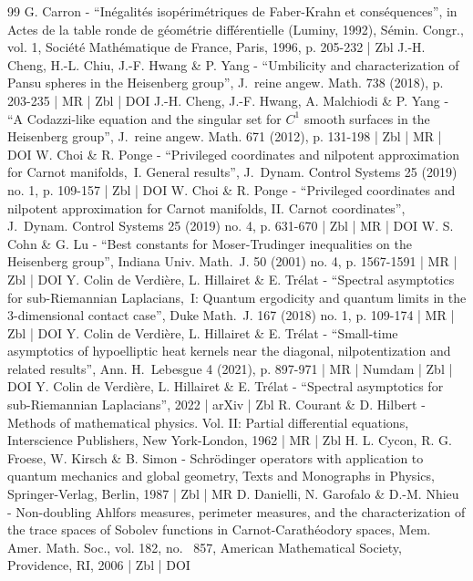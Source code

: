 \begin{thebibliography}{99}
G. Carron - “Inégalités isopérimétriques de Faber-Krahn et conséquences”, in Actes de la table ronde de géométrie différentielle (Luminy, 1992), Sémin. Congr., vol. 1, Société Mathématique de France, Paris, 1996, p. 205-232 | Zbl
J.-H. Cheng, H.-L. Chiu, J.-F. Hwang \& P. Yang - “Umbilicity and characterization of Pansu spheres in the Heisenberg group”, J. reine angew. Math. 738 (2018), p. 203-235 | MR | Zbl | DOI
J.-H. Cheng, J.-F. Hwang, A. Malchiodi \& P. Yang - “A Codazzi-like equation and the singular set for $C^1$ smooth surfaces in the Heisenberg group”, J. reine angew. Math. 671 (2012), p. 131-198 | Zbl | MR | DOI
W. Choi \& R. Ponge - “Privileged coordinates and nilpotent approximation for Carnot manifolds, I. General results”, J. Dynam. Control Systems 25 (2019) no. 1, p. 109-157 | Zbl | DOI
W. Choi \& R. Ponge - “Privileged coordinates and nilpotent approximation for Carnot manifolds, II. Carnot coordinates”, J. Dynam. Control Systems 25 (2019) no. 4, p. 631-670 | Zbl | MR | DOI
W. S. Cohn \& G. Lu - “Best constants for Moser-Trudinger inequalities on the Heisenberg group”, Indiana Univ. Math. J. 50 (2001) no. 4, p. 1567-1591 | MR | Zbl | DOI
Y. Colin de Verdière, L. Hillairet \& E. Trélat - “Spectral asymptotics for sub-Riemannian Laplacians, I: Quantum ergodicity and quantum limits in the 3-dimensional contact case”, Duke Math. J. 167 (2018) no. 1, p. 109-174 | MR | Zbl | DOI
Y. Colin de Verdière, L. Hillairet \& E. Trélat - “Small-time asymptotics of hypoelliptic heat kernels near the diagonal, nilpotentization and related results”, Ann. H. Lebesgue 4 (2021), p. 897-971 | MR | Numdam | Zbl | DOI
Y. Colin de Verdière, L. Hillairet \& E. Trélat - “Spectral asymptotics for sub-Riemannian Laplacians”, 2022 | arXiv | Zbl
R. Courant \& D. Hilbert - Methods of mathematical physics. Vol. II: Partial differential equations, Interscience Publishers, New York-London, 1962 | MR | Zbl
H. L. Cycon, R. G. Froese, W. Kirsch \& B. Simon - Schrödinger operators with application to quantum mechanics and global geometry, Texts and Monographs in Physics, Springer-Verlag, Berlin, 1987 | Zbl | MR
D. Danielli, N. Garofalo \& D.-M. Nhieu - Non-doubling Ahlfors measures, perimeter measures, and the characterization of the trace spaces of Sobolev functions in Carnot-Carathéodory spaces, Mem. Amer. Math. Soc., vol. 182, no.  857, American Mathematical Society, Providence, RI, 2006 | Zbl | DOI

\end{thebibliography}

